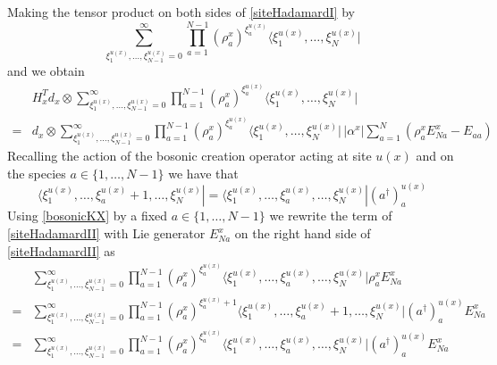 \documentclass[10pt]{article}
\numberwithin{equation}{section}
\numberwithin{equation}{subsection}
\begin{document}
Making the tensor product on both sides of \eqref{siteHadamardI} by 
\begin{equation}
\sum_{\xi_{1}^{u(x)},\ldots,\xi_{N-1}^{u(x)}=0}^{\infty}\prod_{a=1}^{N-1}\left(\rho_{a}^{x}\right)^{\xi_{a}^{u(x)}}\langle \xi_{1}^{u(x)},\ldots,\xi_{N}^{u(x)}|
\end{equation}
and we obtain 
\begin{equation}\label{siteHadamardII}
    \begin{split}
&H_{x}^{T}d_{x}\otimes\sum_{\xi_{1}^{u(x)},\ldots,\xi_{N-1}^{u(x)}=0}^{\infty}\prod_{a=1}^{N-1}\left(\rho_{a}^{x}\right)^{\xi_{a}^{u(x)}}\langle \xi_{1}^{u(x)},\ldots,\xi_{N}^{u(x)}|
\\=&
d_{x}\otimes \sum_{\xi_{1}^{u(x)},\ldots,\xi_{N-1}^{u(x)}=0}^{\infty}\prod_{a=1}^{N-1}\left(\rho_{a}^{x}\right)^{\xi_{a}^{u(x)}}\langle \xi_{1}^{u(x)},\ldots,\xi_{N}^{u(x)}|\,|\alpha^{x}|\sum_{a=1}^{N}\left(\rho_{a}^{x}E_{Na}^{x}-E_{aa}\right)
    \end{split}
\end{equation}
Recalling the action of the bosonic creation operator acting at site $u(x)$ and on the species $a\in \{1,\ldots,N-1\}$ we have that 
\begin{equation}\label{bosonicKX}
    \langle \xi_{1}^{u(x)},\ldots,\xi_{a}^{u(x)}+1,\ldots,\xi_{N}^{u(x)}|=  \langle \xi_{1}^{u(x)},\ldots,\xi_{a}^{u(x)},\ldots,\xi_{N}^{u(x)}|(a^{\dagger})^{u(x)}_{a}
\end{equation}
Using \eqref{bosonicKX} by a fixed $a\in \{1,\ldots,N-1\}$ we rewrite the term of \eqref{siteHadamardII} with Lie generator $E_{Na}^{x}$ on the right hand side of \eqref{siteHadamardII} as 
\begin{equation}
    \begin{split}
&\sum_{\xi_{1}^{u(x)},\ldots,\xi_{N-1}^{u(x)}=0}^{\infty}\prod_{a=1}^{N-1}\left(\rho_{a}^{x}\right)^{\xi_{a}^{u(x)}}\langle \xi_{1}^{u(x)},\ldots,\xi_{a}^{u(x)},\ldots,\xi_{N}^{u(x)}|\rho_{a}^{x}E_{Na}^{x}
\\=&
\sum_{\xi_{1}^{u(x)},\ldots,\xi_{N-1}^{u(x)}=0}^{\infty}\prod_{a=1}^{N-1}\left(\rho_{a}^{x}\right)^{\xi_{a}^{u(x)}+1}\langle \xi_{1}^{u(x)},\ldots,\xi_{a}^{u(x)}+1,\ldots,\xi_{N}^{u(x)}|(a^{\dagger})_{a}^{u(x)}E_{Na}^{x}
\\=&
\sum_{\xi_{1}^{u(x)},\ldots,\xi_{N-1}^{u(x)}=0}^{\infty}\prod_{a=1}^{N-1}\left(\rho_{a}^{x}\right)^{\xi_{a}^{u(x)}}\langle \xi_{1}^{u(x)},\ldots,\xi_{a}^{u(x)},\ldots,\xi_{N}^{u(x)}|(a^{\dagger})_{a}^{u(x)}E_{Na}^{x}
    \end{split}
\end{equation}
\end{document}
